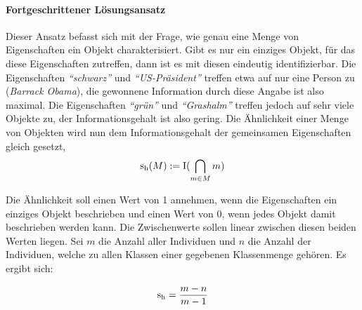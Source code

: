 \paragraph{Fortgeschrittener Lösungsansatz}
Dieser Ansatz befasst sich mit der Frage, wie genau eine Menge von Eigenschaften ein Objekt charakterisiert.
Gibt es nur ein einziges Objekt, für das diese Eigenschaften zutreffen, dann ist es mit diesen eindeutig identifizierbar.
Die Eigenschaften \emph{"`schwarz"'} und \emph{"`US-Präsident"'} treffen etwa auf nur eine Person zu (\emph{Barrack Obama}),
die gewonnene Information durch diese Angabe ist also maximal.
Die Eigenschaften \emph{"`grün"'} und \emph{"`Grashalm"'} treffen jedoch auf sehr viele Objekte zu, der Informationsgehalt ist also gering.
Die Ähnlichkeit einer Menge von Objekten wird nun dem Informationsgehalt der gemeinsamen Eigenschaften gleich gesetzt,
\begin{equation*}
\textnormal{s}_{\textnormal{h}}(M) := \textnormal{I}(\bigcap_{m\in M} m) 
\end{equation*}

Die Ähnlichkeit soll einen Wert von 1 annehmen, wenn die Eigenschaften ein einziges Objekt beschrieben und einen Wert von 0, wenn jedes Objekt damit beschrieben werden kann.
Die Zwischenwerte sollen linear zwischen diesen beiden Werten liegen. Sei $m$ die Anzahl aller Individuen und $n$ die Anzahl der Individuen, welche zu allen Klassen einer gegebenen Klassenmenge gehören. Es ergibt sich:

\begin{dfn}
\begin{equation*}
\textnormal{s}_{\textnormal{h}} = \dfrac{m-n}{m-1}
\end{equation*}
\end{dfn}

